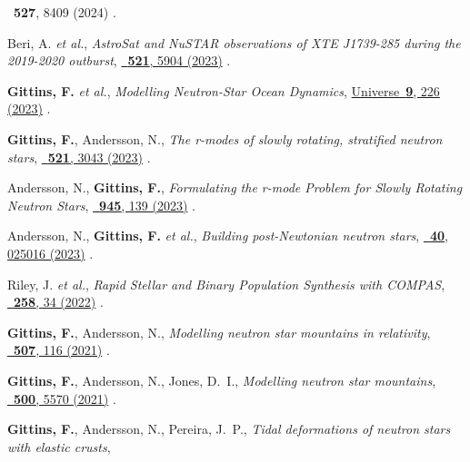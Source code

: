 \begin{etaremune}[start=\value{pubCounter}]
    {\mnras\ \textbf{527}, 8409 (2024)}
    .
    \item Beri, A. \textit{et al.},
    \textit{AstroSat and NuSTAR observations of XTE J1739-285 during the
    2019-2020 outburst},
    \href{https://doi.org/10.1093/mnras/stad902}%
    {\mnras\ \textbf{521}, 5904 (2023)}
    .
    \item \textbf{Gittins, F.} \textit{et al.},
    \textit{Modelling Neutron-Star Ocean Dynamics},
    \href{https://doi.org/10.3390/universe9050226}%
    {Universe\ \textbf{9}, 226 (2023)}
    .
    \item \textbf{Gittins, F.}, Andersson, N.,
    \textit{The r-modes of slowly rotating, stratified neutron stars},
    \href{https://doi.org/10.1093/mnras/stad672}%
    {\mnras\ \textbf{521}, 3043 (2023)}
    .
    \item Andersson, N., \textbf{Gittins, F.},
    \textit{Formulating the r-mode Problem for Slowly Rotating Neutron Stars},
    \href{https://doi.org/10.3847/1538-4357/acbc1e}%
    {\apj\ \textbf{945}, 139 (2023)}
    .
    \item Andersson, N., \textbf{Gittins, F.} \textit{et al.},
    \textit{Building post-Newtonian neutron stars},
    \href{https://doi.org/10.1088/1361-6382/acace5}%
    {\cqg\ \textbf{40}, 025016 (2023)}
    .
    \item Riley, J. \textit{et al.},
    \textit{Rapid Stellar and Binary Population Synthesis with COMPAS},
    \href{https://doi.org/10.3847/1538-4365/ac416c}%
    {\apjs\ \textbf{258}, 34 (2022)}
    .
    \item \textbf{Gittins, F.}, Andersson, N.,
    \textit{Modelling neutron star mountains in relativity},
    \href{https://doi.org/10.1093/mnras/stab2048}%
    {\mnras\ \textbf{507}, 116 (2021)}
    .
    \item \textbf{Gittins, F.}, Andersson, N., Jones, D.~I.,
    \textit{Modelling neutron star mountains},
    \href{https://doi.org/10.1093/mnras/staa3635}%
    {\mnras\ \textbf{500}, 5570 (2021)}
    .
    \item \textbf{Gittins, F.}, Andersson, N., Pereira, J.~P.,
    \textit{Tidal deformations of neutron stars with elastic crusts},

\end{etaremune}
